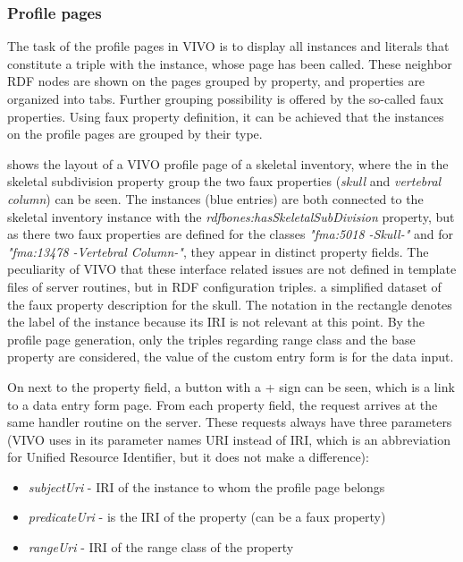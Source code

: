 \subsubsection{Profile pages} \label{vivoPp}

The task of the profile pages in VIVO is to display all instances and literals that constitute a triple with the instance, whose page has been called. These neighbor RDF nodes are shown on the pages grouped by property, and properties are organized into tabs. Further grouping possibility is offered by the so-called faux properties. Using faux property definition, it can be achieved that the instances on the profile pages are grouped by their type.


 shows the layout of a VIVO profile page of a skeletal inventory, where the in the skeletal subdivision property group the two faux properties (\textit{skull} and \textit{vertebral column}) can be seen. The instances (blue entries) are both connected to the skeletal inventory instance with the \textit{rdfbones:hasSkeletalSubDivision} property, but as there two faux properties are defined for the classes \textit{"fma:5018 -Skull-"} and for \textit{"fma:13478 -Vertebral Column-"}, they appear in distinct property fields. The peculiarity of VIVO that these interface related issues are not defined in template files of server routines, but in RDF configuration triples.  a simplified dataset of the faux property description for the skull. The notation in the rectangle denotes the label of the instance because its IRI is not relevant at this point. By the profile page generation, only the triples regarding range class and the base property are considered, the value of the custom entry form is for the data input. 


On  next to the property field, a button with a + sign can be seen, which is a link to a data entry form page. From each property field, the request arrives at the same handler routine on the server. These requests always have three parameters (VIVO uses in its parameter names URI instead of IRI, which is an abbreviation for Unified Resource Identifier, but it does not make a difference):

\begin{itemize}
	\item{ \textit{subjectUri}} - IRI of the instance to whom the profile page belongs
	\item{ \textit{predicateUri}} -  is the IRI of the property (can be a faux property)
	\item{ \textit{rangeUri}} - IRI of the range class of the property
\end{itemize}

